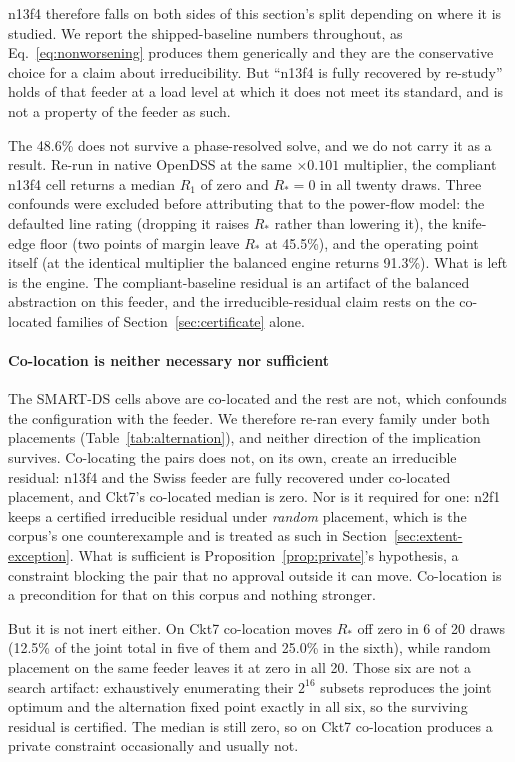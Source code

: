 \documentclass[review,authoryear,12pt]{elsarticle}
\begin{document}
n13f4 therefore falls on both sides of this section's split depending on where
it is studied. We report the shipped-baseline numbers throughout, as
Eq.~\eqref{eq:nonworsening} produces them generically and they are the
conservative choice for a claim about irreducibility. But ``n13f4 is fully
recovered by re-study'' holds of that feeder at a load level at which it does
not meet its standard, and is not a property of the feeder as such.

The 48.6\% does not survive a phase-resolved solve, and we do not carry it as
a result. Re-run in native OpenDSS at the same $\times 0.101$ multiplier, the
compliant n13f4 cell returns a median $R_{1}$ of zero and $R_{\ast} = 0$ in all
twenty draws. Three confounds were excluded before attributing that to the
power-flow model: the defaulted line rating (dropping it raises $R_{\ast}$
rather than lowering it), the knife-edge floor (two points of margin leave
$R_{\ast}$ at 45.5\%), and the operating point itself (at the identical
multiplier the balanced engine returns 91.3\%). What is left is the engine.
The compliant-baseline residual is an artifact of the balanced abstraction on
this feeder, and the irreducible-residual claim rests on the co-located
families of Section~\ref{sec:certificate} alone.

\paragraph{Co-location is neither necessary nor sufficient}
The SMART-DS cells above are co-located and the rest are not, which confounds
the configuration with the feeder. We therefore re-ran every family under both
placements (Table~\ref{tab:alternation}), and neither direction of the
implication survives. Co-locating the pairs does not, on its own, create an
irreducible residual: n13f4 and the Swiss feeder are fully recovered under
co-located placement, and Ckt7's co-located median is zero. Nor is it required
for one: n2f1 keeps a certified irreducible residual under \emph{random}
placement, which is the corpus's one counterexample and is treated as such in
Section~\ref{sec:extent-exception}. What is sufficient is
Proposition~\ref{prop:private}'s hypothesis, a constraint blocking the pair
that no approval outside it can move. Co-location is a precondition for that on
this corpus and nothing stronger.

But it is not inert either. On Ckt7 co-location moves $R_{\ast}$ off zero in 6
of 20 draws (12.5\% of the joint total in five of them and 25.0\% in the
sixth), while random placement on the same feeder leaves it at zero in all
20. Those six are not a search artifact: exhaustively enumerating their
$2^{16}$ subsets reproduces the joint optimum and the alternation fixed point
exactly in all six, so the surviving residual is certified. The median is still
zero, so on Ckt7 co-location produces a private
constraint occasionally and usually not.
\end{document}
